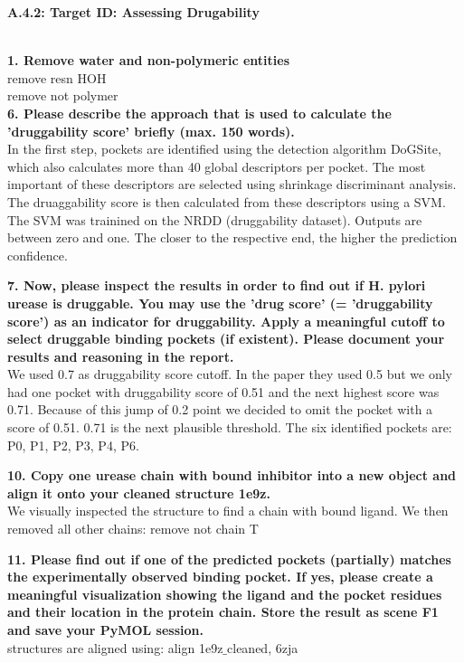 \documentclass[a4paper,10pt]{article}
\begin{document}
\begin{large}
	\vspace{1.0cm}
	\textbf{A.4.2: Target ID: Assessing Drugability}
\end{large}	\\ [2mm]
\textbf{1. Remove water and non-polymeric entities} \\
remove resn HOH \\
remove not polymer \\



\textbf{6. Please describe the approach that is used to calculate the ’druggability score’ briefly (max. 150 words).} \\
In the first step, pockets are identified using the detection algorithm DoGSite, which also calculates more than 40 global descriptors per pocket.
The most important of these descriptors are selected using shrinkage discriminant analysis. The druaggability score is then calculated from these descriptors using a SVM.
The SVM was trainined on the NRDD (druggability dataset). Outputs are between zero and one. The closer to the respective end, the higher the prediction confidence.

\textbf{7. Now, please inspect the results in order to find out if H. pylori urease is druggable. You may use the ’drug
score’ (= ’druggability score’) as an indicator for druggability. Apply a meaningful cutoﬀ to select druggable
binding pockets (if existent). Please document your results and reasoning in the report.} \\
We used 0.7 as druggability score cutoff. In the paper they used 0.5 but we only had one pocket with druggability score
of 0.51 and the next highest score was 0.71. Because of this jump of 0.2 point we decided to omit the pocket with a score of 0.51.
0.71 is the next plausible threshold. The six identified pockets are: P0, P1, P2, P3, P4, P6.

\textbf{10. Copy one urease chain with bound inhibitor into a new object and align it onto your cleaned structure 1e9z.} \\
We visually inspected the structure to find a chain with bound ligand. We then removed all other chains: remove not chain T

\textbf{11. Please find out if one of the predicted pockets (partially) matches the experimentally observed binding pocket.
If yes, please create a meaningful visualization showing the ligand and the pocket residues and their location
in the protein chain. Store the result as scene F1 and save your PyMOL session.} \\
structures are aligned using: align 1e9z$\_$cleaned, 6zja
\end{document}
